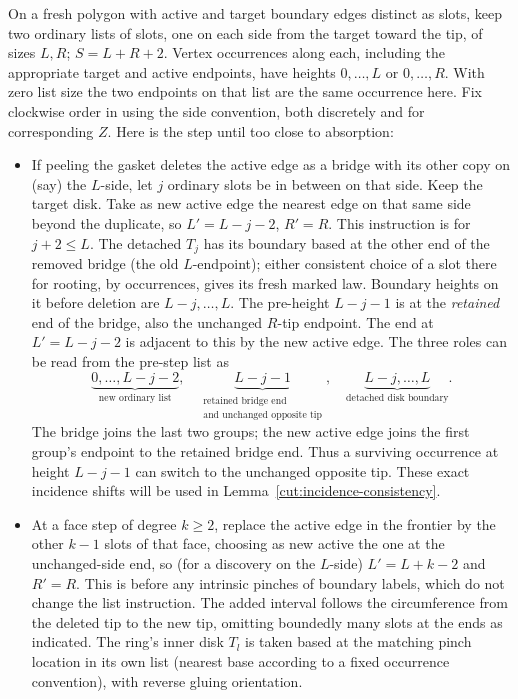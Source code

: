 On a fresh polygon with active and target boundary edges distinct as slots, keep two ordinary lists of slots, one on each side from the target toward the tip, of sizes \(L,R\); \(S=L+R+2\).
Vertex occurrences along each, including the appropriate target and active endpoints, have heights \(0,\ldots,L\) or \(0,\ldots,R\).
With zero list size the two endpoints on that list are the same occurrence here.
Fix clockwise order in using the side convention, both discretely and for corresponding \(Z\).
Here is the step until too close to absorption:
\begin{itemize}
\item If peeling the gasket deletes the active edge as a bridge with its other copy on (say) the \(L\)-side, let \(j\) ordinary slots be in between on that side.
Keep the target disk.
Take as new active edge the nearest edge on that same side beyond the duplicate, so \(L'=L-j-2\), \(R'=R\).
This instruction is for \(j+2\le L\).
The detached \(T_j\) has its boundary based at the other end of the removed bridge (the old \(L\)-endpoint); either consistent choice of a slot there for rooting, by occurrences, gives its fresh marked law.
Boundary heights on it before deletion are \(L-j,\ldots,L\).
The pre-height \(L-j-1\) is at the \emph{retained} end of the bridge, also the unchanged \(R\)-tip endpoint.
The end at \(L'=L-j-2\) is adjacent to this by the new active edge.
The three roles can be read from the pre-step list as
\[
 \underbrace{0,\ldots,L-j-2}_{\text{new ordinary list}},\quad
 \underbrace{L-j-1}_{\substack{\text{retained bridge end}\\\text{and unchanged opposite tip}}},\quad
 \underbrace{L-j,\ldots,L}_{\text{detached disk boundary}}.
\]
The bridge joins the last two groups; the new active edge joins the first
group's endpoint to the retained bridge end.  Thus a surviving occurrence
at height $L-j-1$ can switch to the unchanged opposite tip.  These exact
incidence shifts will be used in Lemma~\ref{cut:incidence-consistency}.
\item At a face step of degree \(k\ge2\), replace the active edge in the frontier by the other \(k-1\) slots of that face, choosing as new active the one at the unchanged-side end, so (for a discovery on the \(L\)-side) \(L'=L+k-2\) and \(R'=R\).
This is before any intrinsic pinches of boundary labels, which do not change the list instruction.
The added interval follows the circumference from the deleted tip to the new tip, omitting boundedly many slots at the ends as indicated.
The ring's inner disk \(T_l\) is taken based at the matching pinch location in its own list (nearest base according to a fixed occurrence convention), with reverse gluing orientation.

\end{itemize}

